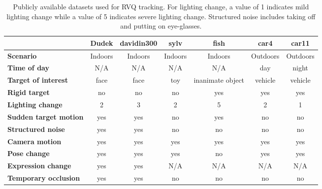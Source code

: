\documentclass[12pt,letterpaper,doublespaced,ETD]{gt-ece-thesis} %
\begin{document}
\begin{Body}
\begin{table}[t]
\caption{Publicly available datasets used for RVQ tracking.  For lighting change, a value of 1 indicates mild lighting change while a value of 5 indicates severe lighting change.  Structured noise includes taking off and putting on eye-glasses.}
\footnotesize
\centering
\begin{tabular}{|l|c|c|c|c|c|c|}\hline
							&\textbf{Dudek} & \textbf{davidin300} & \textbf{sylv} & \textbf{fish} & \textbf{car4} & \textbf{car11}\\\hline
\textbf{Scenario} 		&Indoors &Indoors &Indoors &Indoors &Outdoors &Outdoors\\\hline
\textbf{Time of day}	&N/A &N/A &N/A &N/A &day &night\\\hline
\textbf{Target of interest} &face &face & toy &inanimate object & vehicle & vehicle\\\hline
\textbf{Rigid target} &no &no & no &yes &yes &yes\\\hline
\textbf{Lighting change}	 &2 &3 &2 &5 &2 &1 \\\hline
\textbf{Sudden target motion} &yes &yes &no &yes &no &no\\\hline
\textbf{Structured noise}&yes &yes &no&no&no&no\\\hline
\textbf{Camera motion}&yes&yes&yes&yes&yes&yes\\\hline
\textbf{Pose change}&yes&yes&yes&no&yes&yes\\\hline
\textbf{Expression change}&yes&yes&N/A &N/A &N/A &N/A\\\hline
\textbf{Temporary occlusion}&yes&yes&no&no&no&no\\\hline
\end{tabular}
\label{Tab:datasets_used}
\end{table}







\end{Body}

\begin{EndMatter}
\end{EndMatter}
\end{document}
